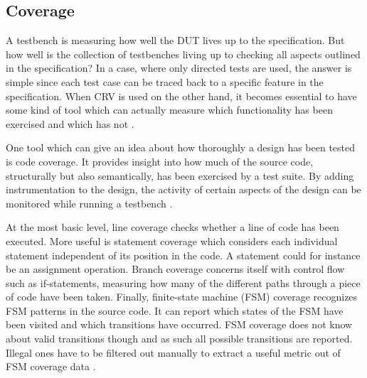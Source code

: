 \subsection{Coverage} %

A testbench is measuring how well the DUT lives up to the specification. But how well is the collection of
testbenches living up to checking all aspects outlined in the specification? In a case, where only directed tests are
used, the answer is simple since each test case can be traced back to a specific feature in the specification. When
CRV is used on the other hand, it becomes essential to have some kind of tool which can actually measure which
functionality has been exercised and which has not \cite[Ch. 15]{mehta2021introduction}.

One tool which can give an idea about how thoroughly a design has been tested is code coverage. It provides insight
into how much of the source code, structurally but also semantically, has been exercised by a test suite. By adding
instrumentation to the design, the activity of certain aspects of the design can be monitored while running a
testbench \cite[Ch. 2]{bergeron2012writing}.

At the most basic level, line coverage checks whether a line of code has been executed. More useful is statement
coverage which considers each individual statement independent of its position in the code. A statement could for
instance be an assignment operation. Branch coverage concerns itself with control flow such as if-statements,
measuring how many of the different paths through a piece of code have been taken. Finally, finite-state machine
(FSM) coverage recognizes FSM patterns in the source code. It can report which states of the FSM have been visited
and which transitions have occurred. FSM coverage does not know about valid transitions though and as such all
possible transitions are reported. Illegal ones have to be filtered out manually to extract a useful metric out of
FSM coverage data \cite[Ch. 15]{mehta2021introduction}.

